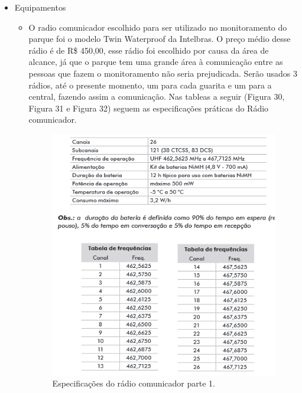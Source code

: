 \begin{itemize}
	\item Equipamentos
	
	\begin{itemize}
	\item O radio comunicador escolhido para ser utilizado no monitoramento do parque foi o modelo Twin Waterproof da Intelbras. O preço médio desse rádio é de R\$ 450,00, esse rádio foi escolhido por causa da área de alcance, já que o parque tem uma grande área à comunicação entre as pessoas que fazem o monitoramento não seria prejudicada. Serão usados 3 rádios, até o presente momento, um para cada guarita e um para a central, fazendo assim a comunicação.  Nas tableas a seguir (Figura 30, Figura 31 e Figura 32)  seguem as especificações práticas do Rádio comunicador.
	
	\begin{figure}[H]
	 \centering
	\label{Especificações do rádio comunicador parte 1}
	 \includegraphics[keepaspectratio=true,scale=0.8]{monitoramento/27.png}
	 \caption{Especificações do rádio comunicador parte 1.}
	\end{figure}
	

\end{itemize}
\end{itemize}
